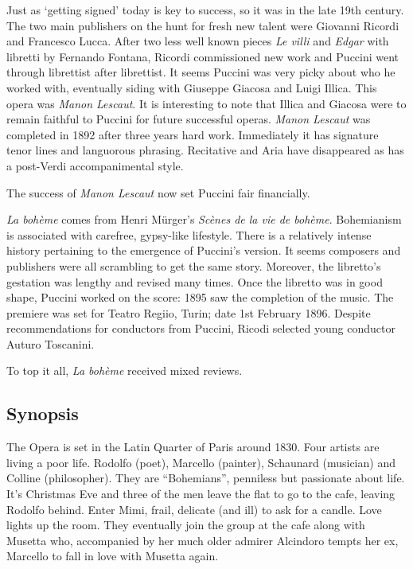Just as `getting signed' today is key to success, so it was in the late 19th century. The two main publishers 
on the hunt for fresh new talent were Giovanni Ricordi and Francesco Lucca. After two less well known pieces 
\textit{Le villi} and \textit{Edgar} with libretti by Fernando Fontana, Ricordi commissioned new work and 
Puccini went through librettist after librettist. It seems Puccini was very picky about who he worked with, 
eventually siding with Giuseppe Giacosa and Luigi Illica. This opera was \textit{Manon Lescaut}. It is 
interesting to note that Illica and Giacosa were to remain faithful to Puccini for future successful operas. 
\textit{Manon Lescaut} was completed in 1892 after three years hard work. Immediately it has signature tenor 
lines and languorous phrasing. Recitative and Aria have disappeared as has a post-Verdi accompanimental 
style. 

The success of \textit{Manon Lescaut} now set Puccini fair financially. 

\textit{La boh\`eme} comes from Henri M\"urger's \textit{Sc\`enes de la vie de boh\`eme}. Bohemianism is associated with carefree, gypsy-like lifestyle. There is a relatively intense history pertaining to the emergence of Puccini's version. It seems composers and publishers were all scrambling to get the same story. Moreover, the libretto's gestation was lengthy and revised many times. Once the libretto was in good shape, Puccini worked on the score: 1895 saw the completion of the music. The premiere was set for Teatro Regiio, Turin; date 1st February 1896. Despite recommendations for conductors from Puccini, Ricodi selected young conductor Auturo Toscanini.

To top it all, \textit{La boh\`eme} received mixed reviews. 

\subsection{Synopsis}
The Opera is set in the Latin Quarter of Paris around 1830. Four artists are living a poor life. Rodolfo (poet), Marcello (painter), Schaunard (musician) and Colline (philosopher). They are ``Bohemians'', penniless but passionate about life. It's Christmas Eve and three of the men leave the flat to go to the cafe, leaving Rodolfo behind. Enter Mimi, frail, delicate (and ill) to ask for a candle. Love lights up the room. They eventually join the group at the cafe along with Musetta who, accompanied by her much older admirer Alcindoro tempts her ex, Marcello to fall in love with Musetta again. 

